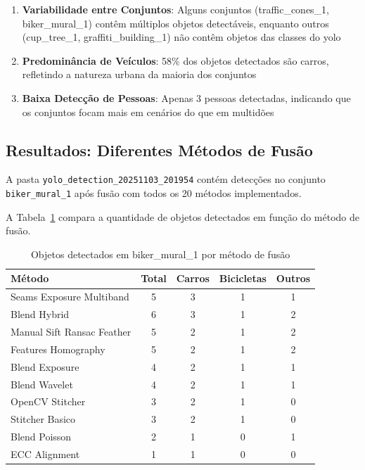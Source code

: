 \begin{enumerate}
    \item \textbf{Variabilidade entre Conjuntos}: Alguns conjuntos (traffic\_cones\_1, biker\_mural\_1) contêm múltiplos objetos detectáveis, enquanto outros (cup\_tree\_1, graffiti\_building\_1) não contêm objetos das classes do \gls{yolo}

    \item \textbf{Predominância de Veículos}: 58\% dos objetos detectados são carros, refletindo a natureza urbana da maioria dos conjuntos

    \item \textbf{Baixa Detecção de Pessoas}: Apenas 3 pessoas detectadas, indicando que os conjuntos focam mais em cenários do que em multidões
\end{enumerate}

\subsection{Resultados: Diferentes Métodos de Fusão}

A pasta \texttt{yolo\_detection\_20251103\_201954} contém detecções no conjunto \texttt{biker\_mural\_1} após fusão com todos os 20 métodos implementados.

A Tabela~\ref{tab:detection-by-method} compara a quantidade de objetos detectados em função do método de fusão.

\begin{table}[htb]
\centering
\caption{Objetos detectados em biker\_mural\_1 por método de fusão}
\label{tab:detection-by-method}
\small
\begin{tabular}{lcccc}
\hline
\textbf{Método} & \textbf{Total} & \textbf{Carros} & \textbf{Bicicletas} & \textbf{Outros} \\ \hline
Seams Exposure Multiband & 5 & 3 & 1 & 1 \\
Blend Hybrid & 6 & 3 & 1 & 2 \\
Manual Sift Ransac Feather & 5 & 2 & 1 & 2 \\
Features Homography & 5 & 2 & 1 & 2 \\
Blend Exposure & 4 & 2 & 1 & 1 \\
Blend Wavelet & 4 & 2 & 1 & 1 \\
OpenCV Stitcher & 3 & 2 & 1 & 0 \\
Stitcher Basico & 3 & 2 & 1 & 0 \\
Blend Poisson & 2 & 1 & 0 & 1 \\
ECC Alignment & 1 & 1 & 0 & 0 \\
\hline
\end{tabular}
\end{table}

